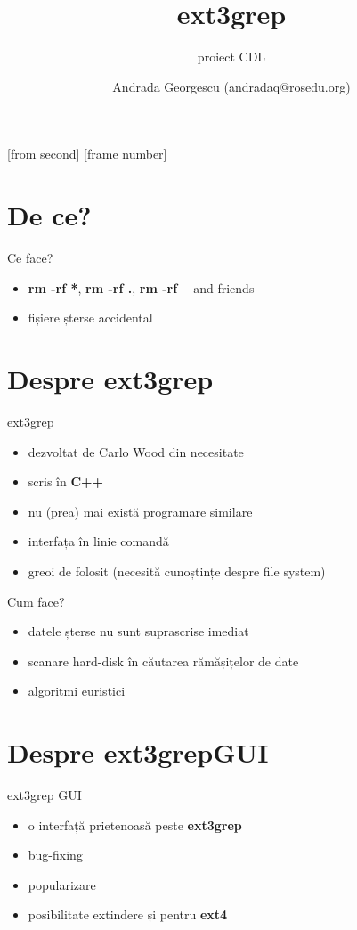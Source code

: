 \documentclass{beamer}
\title[ext3grep GUI]{ext3grep}
\subtitle{proiect CDL}
\institute[ROSEdu]{ROSEdu}
\author[Q]{Andrada Georgescu (andradaq@rosedu.org)}
\begin{document}
[from second]
[frame number]

\frame{\titlepage}

\section{De ce?}
\begin{frame}{Ce face?}
	\begin{itemize}
        \item \textbf{rm -rf *}, \textbf{rm -rf .}, \textbf{rm -rf ~} and friends
        \item fișiere șterse accidental
	\end{itemize}
\end{frame}

\section{Despre ext3grep}
\begin{frame}{ext3grep}
  \begin{itemize}
    \item dezvoltat de Carlo Wood din necesitate
	\item scris în \textbf{C++}
	\item nu (prea) mai există programare similare
	\item interfața în linie comandă
	\item greoi de folosit (necesită cunoștințe despre file system)
  \end{itemize}
\end{frame}

\begin{frame}{Cum face?}
  \begin{itemize}
    \item datele șterse nu sunt suprascrise imediat
    \item scanare hard-disk în căutarea rămășițelor de date
	\item algoritmi euristici
  \end{itemize}
\end{frame}

\section{Despre ext3grepGUI}
\begin{frame}{ext3grep GUI}
 \begin{itemize}
 \item o interfață prietenoasă peste \textbf{ext3grep}
 \item bug-fixing
 \item popularizare
 \item posibilitate extindere și pentru \textbf{ext4}
 \end{itemize}
\end{frame}
\end{document}

